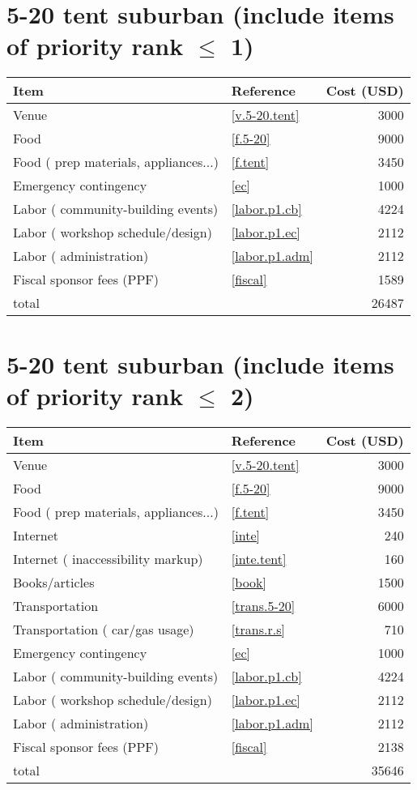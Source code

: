 \section*{5-20 tent suburban (include items of priority rank $\leq$ 1)}
\begin{center}
\begin{tabular}{llr}
Item & Reference & Cost (USD) \\ \hline
Venue & \ref{v.5-20.tent} & 3000 \\
Food & \ref{f.5-20} & 9000 \\
Food ( prep materials, appliances...) & \ref{f.tent} & 3450 \\
Emergency contingency & \ref{ec} & 1000 \\
Labor ( community-building events) & \ref{labor.p1.cb} & 4224 \\
Labor ( workshop schedule/design) & \ref{labor.p1.ec} & 2112 \\
Labor ( administration) & \ref{labor.p1.adm} & 2112 \\
Fiscal sponsor fees (PPF) & \ref{fiscal} & 1589 \\ \hline
total &  & 26487
\end{tabular}
\end{center}
\newpage
\section*{5-20 tent suburban (include items of priority rank $\leq$ 2)}
\begin{center}
\begin{tabular}{llr}
Item & Reference & Cost (USD) \\ \hline
Venue & \ref{v.5-20.tent} & 3000 \\
Food & \ref{f.5-20} & 9000 \\
Food ( prep materials, appliances...) & \ref{f.tent} & 3450 \\
Internet & \ref{inte} & 240 \\
Internet ( inaccessibility markup) & \ref{inte.tent} & 160 \\
Books/articles & \ref{book} & 1500 \\
Transportation & \ref{trans.5-20} & 6000 \\
Transportation ( car/gas usage) & \ref{trans.r.s} & 710 \\
Emergency contingency & \ref{ec} & 1000 \\
Labor ( community-building events) & \ref{labor.p1.cb} & 4224 \\
Labor ( workshop schedule/design) & \ref{labor.p1.ec} & 2112 \\
Labor ( administration) & \ref{labor.p1.adm} & 2112 \\
Fiscal sponsor fees (PPF) & \ref{fiscal} & 2138 \\ \hline
total &  & 35646
\end{tabular}
\end{center}
\newpage

